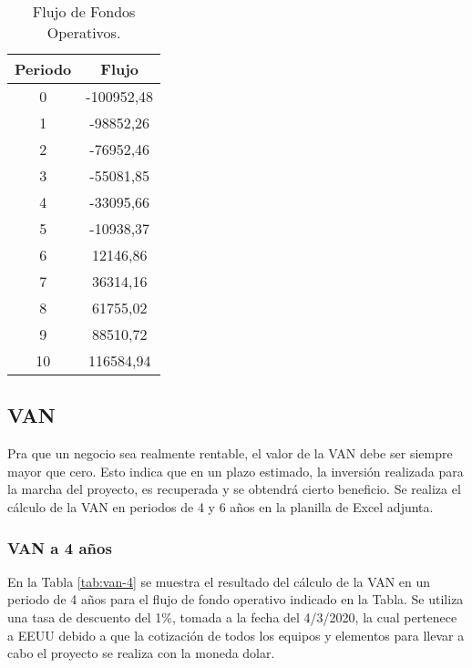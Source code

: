 \begin{table}[H]
  \tiny
  \centering
    \begin{tabular}{|c|c|}
    \hline
    \rowcolor[rgb]{ .773,  .851,  .945} \textbf{Periodo} & \textbf{Flujo} \bigstrut\\
    \hline
    0     & -100952,48 \bigstrut\\
    \hline
    1     & -98852,26 \bigstrut\\
    \hline
    2     & -76952,46 \bigstrut\\
    \hline
    3     & -55081,85 \bigstrut\\
    \hline
    4     & -33095,66 \bigstrut\\
    \hline
    5     & -10938,37 \bigstrut\\
    \hline
    6     & 12146,86 \bigstrut\\
    \hline
    7     & 36314,16 \bigstrut\\
    \hline
    8     & 61755,02 \bigstrut\\
    \hline
    9     & 88510,72 \bigstrut\\
    \hline
    10    & 116584,94 \bigstrut\\
    \hline
    \end{tabular}%
     \caption{Flujo de Fondos Operativos.}
  \label{tab:flujo-fondos-operativos}%
\end{table}%





\subsection{VAN}

Pra que un negocio sea realmente rentable, el valor de la VAN debe ser siempre mayor que cero. Esto indica que en un plazo estimado, la inversión realizada para la marcha del proyecto, es recuperada y se obtendrá cierto beneficio. Se realiza el cálculo de la VAN en periodos de 4 y 6 años en la planilla de Excel adjunta.

\subsubsection{VAN a 4 años}

En la Tabla \ref{tab:van-4} se muestra el resultado del cálculo de la VAN en un periodo de 4 años para el flujo de fondo operativo indicado en la Tabla. Se utiliza una tasa de descuento del  1\%, tomada a la fecha del 4/3/2020, la cual pertenece a EEUU debido a que la cotización de todos los equipos y elementos para llevar a cabo el proyecto se realiza con la moneda dolar.


